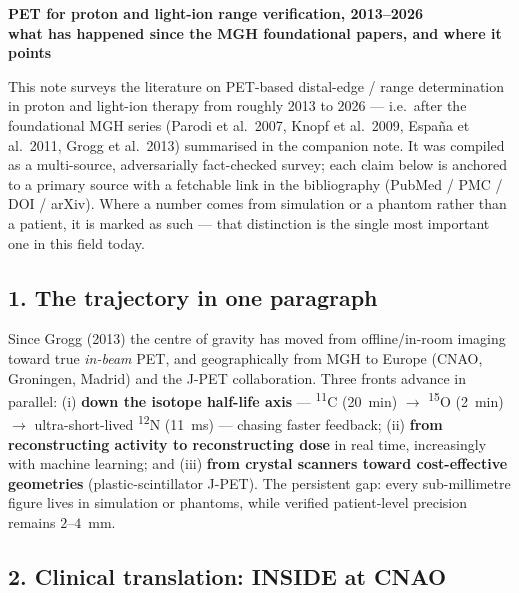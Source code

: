\documentclass[11pt]{article}
\newcommand{\iso}[2]{\textsuperscript{#1}#2}
\begin{document}
\begin{center}
  {\large\textbf{PET for proton and light-ion range verification, 2013--2026}}\\[2pt]
  {\large\textbf{what has happened since the MGH foundational papers, and where it points}}
\end{center}
\medskip

\noindent
This note surveys the literature on PET-based distal-edge / range determination
in proton and light-ion therapy from roughly 2013 to 2026 --- i.e.\ after the
foundational MGH series (Parodi et al.\ 2007, Knopf et al.\ 2009, Espa\~na et
al.\ 2011, Grogg et al.\ 2013) summarised in the companion note. It was compiled
as a multi-source, adversarially fact-checked survey; each claim below is
anchored to a primary source with a fetchable link in the bibliography (PubMed /
PMC / DOI / arXiv). Where a number comes from simulation or a phantom rather than
a patient, it is marked as such --- that distinction is the single most important
one in this field today.

\subsection*{1. The trajectory in one paragraph}

Since Grogg (2013) the centre of gravity has moved from offline/in-room imaging
toward true \emph{in-beam} PET, and geographically from MGH to Europe (CNAO,
Groningen, Madrid) and the J-PET collaboration. Three fronts advance in parallel:
(i) \textbf{down the isotope half-life axis} --- \iso{11}{C} (20~min)
$\rightarrow$ \iso{15}{O} (2~min) $\rightarrow$ ultra-short-lived \iso{12}{N}
(11~ms) --- chasing faster feedback; (ii) \textbf{from reconstructing activity to
reconstructing dose} in real time, increasingly with machine learning; and (iii)
\textbf{from crystal scanners toward cost-effective geometries} (plastic-scintillator
J-PET). The persistent gap: every sub-millimetre figure lives in simulation or
phantoms, while verified patient-level precision remains $2$--$4$~mm.

\subsection*{2. Clinical translation: INSIDE at CNAO}
\end{document}
